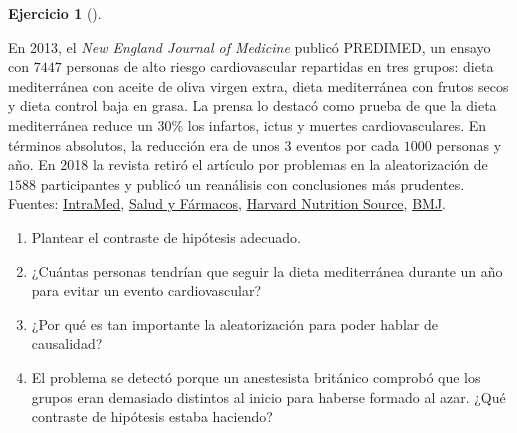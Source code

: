 \documentclass[
  spanish,
  a4paper,
]{scrreport}
\theoremstyle{definition}
\newtheorem{exercise}{Ejercicio}[chapter]
\theoremstyle{remark}
\begin{document}
\begin{exercise}[]\protect\hypertarget{exr-interpretacion-predimed}{}\label{exr-interpretacion-predimed}

En 2013, el \emph{New England Journal of Medicine} publicó PREDIMED, un
ensayo con \(7447\) personas de alto riesgo cardiovascular repartidas en
tres grupos: dieta mediterránea con aceite de oliva virgen extra, dieta
mediterránea con frutos secos y dieta control baja en grasa. La prensa
lo destacó como prueba de que la dieta mediterránea reduce un \(30\)\%
los infartos, ictus y muertes cardiovasculares. En términos absolutos,
la reducción era de unos \(3\) eventos por cada \(1000\) personas y año.
En 2018 la revista retiró el artículo por problemas en la aleatorización
de \(1588\) participantes y publicó un reanálisis con conclusiones más
prudentes. Fuentes:
\href{https://www.intramed.net/content/hoja-de-ruta-nutricional}{IntraMed},
\href{https://www.saludyfarmacos.org/?p=53833}{Salud y Fármacos},
\href{https://nutritionsource.hsph.harvard.edu/2018/06/22/predimed-retraction-republication}{Harvard
Nutrition Source},
\href{https://blogs.bmj.com/bmj/2018/06/22/hilda-bastian-a-mediterranean-diet-trials-retraction-and-republication-leaves-a-trail-of-questions/}{BMJ}.

\begin{enumerate}
\def\labelenumi{\alph{enumi}.}
\item
  Plantear el contraste de hipótesis adecuado.
\item
  ¿Cuántas personas tendrían que seguir la dieta mediterránea durante un
  año para evitar un evento cardiovascular?
\item
  ¿Por qué es tan importante la aleatorización para poder hablar de
  causalidad?
\item
  El problema se detectó porque un anestesista británico comprobó que
  los grupos eran demasiado distintos al inicio para haberse formado al
  azar. ¿Qué contraste de hipótesis estaba haciendo?
\end{enumerate}

\end{exercise}
\end{document}
